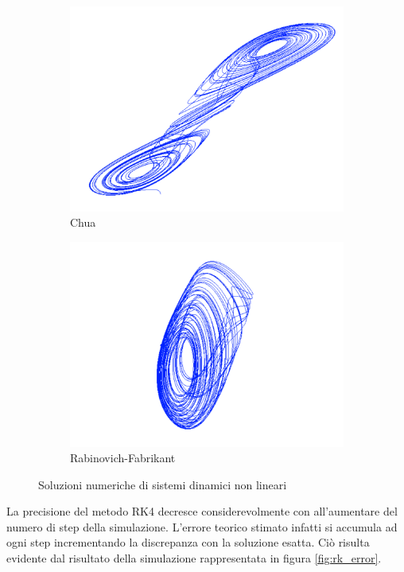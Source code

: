 \begin{figure}[H]
 \quad
 \begin{subfigure}[b]{0.5\textwidth}
  \centering
  \includegraphics[width=\textwidth]{chua}
  \caption{Chua}
  \label{fig:chua}
 \end{subfigure}
 \begin{subfigure}[b]{0.5\textwidth}
  \centering
  \includegraphics[width=\textwidth]{rf}
  \caption{Rabinovich-Fabrikant}
  \label{fig:rf}
 \end{subfigure}

 \caption{Soluzioni numeriche di sistemi dinamici non lineari}\label{fig:systems}
\end{figure}

La precisione del metodo RK4 decresce considerevolmente con all'aumentare del numero di step della simulazione. L'errore teorico stimato infatti si accumula ad ogni step incrementando la discrepanza con la soluzione esatta. Ciò risulta evidente dal risultato della simulazione rappresentata in figura \ref{fig:rk_error}.

